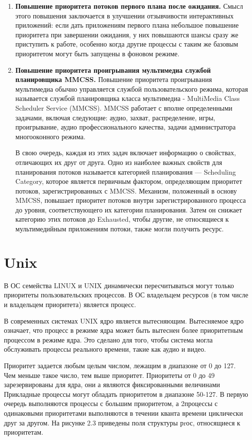 \begin{enumerate}
	\item \textbf{Повышение приоритета потоков первого плана после ожидания.} Смысл этого
	повышения заключается в улучшении отзывчивости интерактивных приложений: если
	дать приложениям первого плана небольшое повышение приоритета при завершении
	ожидания, у них повышаются шансы сразу же приступить к работе, особенно когда
	другие процессы с таким же базовым приоритетом могут быть запущены в фоновом
	режиме.
	\item \textbf{Повышение приоритета проигрывания мультимедиа службой планировщика
	MMCSS.}
	Повышение приоритета проигрывания мультимедиа обычно управляется службой пользовательского режима, которая называется службой планировщика класса мультимедиа - MultiMedia Class Scheduler Service (MMCSS). MMCSS работает с вполне определенными задачами, включая следующие: аудио, захват, распределение, игры, проигрывание, аудио профессионального качества, задачи администратора многооконного режима. 
	
	В свою очередь, каждая из этих задач включает информацию о свойствах, отличающих
	их друг от друга. Одно из наиболее важных свойств для планирования потоков называется категорией планирования — Scheduling Category, которое является первичным
	фактором, определяющим приоритет потоков, зарегистрированных с MMCSS.
	Механизм, положенный в основу MMCSS, повышает приоритет потоков внутри зарегистрированного процесса до уровня, соответствующего их категории планирования.
	Затем он снижает категорию этих потоков до Exhausted, чтобы другие, не относящиеся
	к мультимедийным приложениям потоки, также могли получить ресурс.
\end{enumerate}

\section{Unix}

В ОС семейства LINUX и UNIX динамически пересчитываться могут только приоритеты пользовательских процессов. В ОС владельцем ресурсов (в том числе и владельцем
приоритета) является процесс.

В современных системах UNIX ядро является вытесняющим. Вытесняемое ядро означает,
что процесс в режиме ядра может быть вытеснен более приоритетным процессом в режиме
ядра. Это сделано для того, чтобы система могла обслуживать процессы реального времени,
такие как аудио и видео.

Приоритет задается любым целым числом, лежащим в диапазоне от 0 до 127. Чем меньше
такое число, тем выше приоритет. Приоритеты от 0 до 49 зарезервированы для ядра, они а
являются фиксированными величинами Прикладные процессы могут обладать приоритетом
в диапазоне 50-127. В первую очередь выполняются процессы с большим приоритетом, а
2процессы с одинаковыми приоритетами выполняются в течении кванта времени циклически
друг за другом. На рисунке 2.3 приведены поля структуры рrос, относящиеся к приоритетам.

